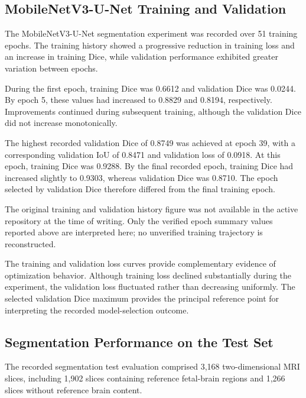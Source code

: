 \subsection{MobileNetV3-U-Net Training and Validation}
\label{subsec:results_2d_segmentation_training}

The MobileNetV3-U-Net segmentation experiment was recorded over 51 training epochs. The training history showed a progressive reduction in training loss and an increase in training Dice, while validation performance exhibited greater variation between epochs.

During the first epoch, training Dice was 0.6612 and validation Dice was 0.0244. By epoch 5, these values had increased to 0.8829 and 0.8194, respectively. Improvements continued during subsequent training, although the validation Dice did not increase monotonically.

The highest recorded validation Dice of 0.8749 was achieved at epoch 39, with a corresponding validation IoU of 0.8471 and validation loss of 0.0918. At this epoch, training Dice was 0.9288. By the final recorded epoch, training Dice had increased slightly to 0.9303, whereas validation Dice was 0.8710. The epoch selected by validation Dice therefore differed from the final training epoch.

The original training and validation history figure was not available in the active repository at the time of writing. Only the verified epoch summary values reported above are interpreted here; no unverified training trajectory is reconstructed.

The training and validation loss curves provide complementary evidence of optimization behavior. Although training loss declined substantially during the experiment, the validation loss fluctuated rather than decreasing uniformly. The selected validation Dice maximum provides the principal reference point for interpreting the recorded model-selection outcome.

\subsection{Segmentation Performance on the Test Set}
\label{subsec:results_2d_segmentation_test}

The recorded segmentation test evaluation comprised 3,168 two-dimensional MRI slices, including 1,902 slices containing reference fetal-brain regions and 1,266 slices without reference brain content.

